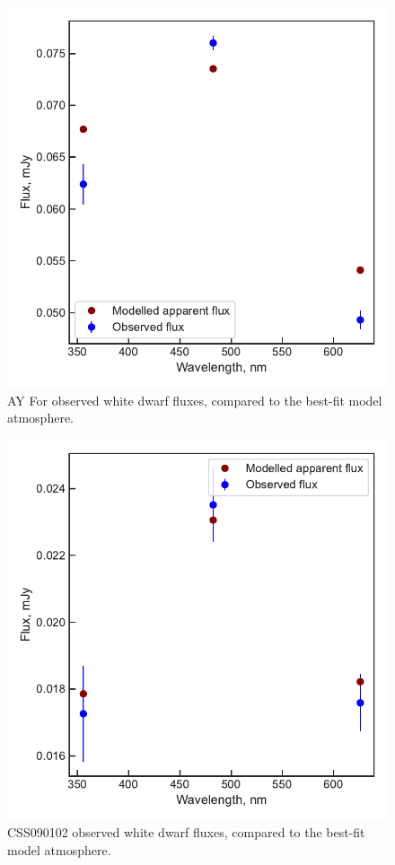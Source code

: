 \begin{figure}
    \centering
    \includegraphics[width=\textwidth]{figures/results/AYFor/fluxplot.pdf}
    \caption{AY For observed white dwarf fluxes, compared to the best-fit model atmosphere.}
    \label{fig:AYFor flux plot}
\end{figure}

\begin{figure}
    \centering
    \includegraphics[width=\textwidth]{figures/results/CSS090102/fluxplot.pdf}
    \caption{CSS090102 observed white dwarf fluxes, compared to the best-fit model atmosphere.}
    \label{fig:CSS090102 flux plot}
\end{figure}

